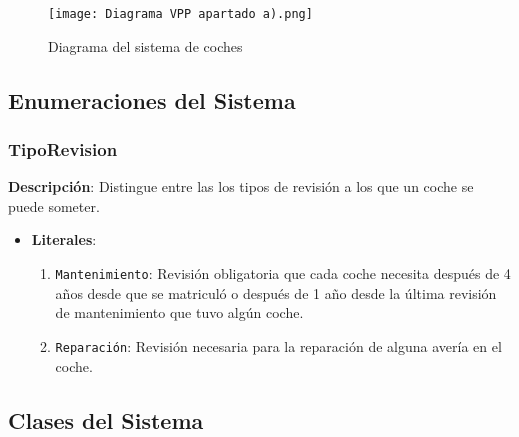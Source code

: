 \documentclass[12pt.a4paper]{article}
\begin{document}
\begin{figure}[H]
     \texttt{[image: Diagrama VPP apartado a).png]}
     \caption{Diagrama del sistema de coches}
     \label{Diagrama del sistema de coches}
\end{figure}
\vspace{1.0 cm}

\subsection{Enumeraciones del Sistema}

\subsubsection{TipoRevision}
\textbf{Descripción}:  
Distingue entre las los tipos de revisión a los que un coche se puede someter.
\begin{itemize}
    \item \textbf{Literales}:
    \begin{enumerate}
        \item \texttt{Mantenimiento}: Revisión obligatoria que cada coche necesita después de 4 años desde que se matriculó o después de 1 año desde la última revisión de mantenimiento que tuvo algún coche.
        \item \texttt{Reparación}: Revisión necesaria para la reparación de alguna avería en el coche.
    \end{enumerate}
\end{itemize}

\subsection{Clases del Sistema}
\end{document}
